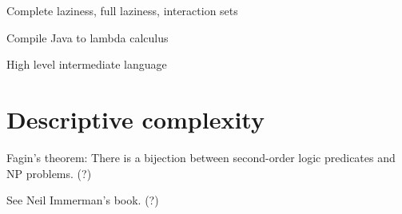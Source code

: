 Complete laziness, full laziness, interaction sets

Compile Java to lambda calculus

High level intermediate language

\section{Descriptive complexity}

Fagin's theorem:
There is a bijection between second-order logic predicates and NP problems. (?)

See Neil Immerman's book. (?)
